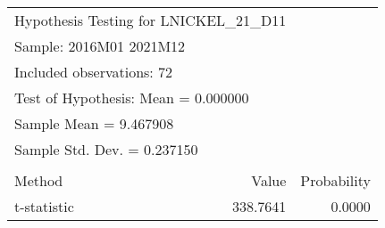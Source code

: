 \begin{tabular}{lrrr}
\toprule
\multicolumn{3}{l}{Hypothesis Testing for LNICKEL\_21\_D11}&\multicolumn{1}{c}{}\\
\multicolumn{2}{l}{Sample: 2016M01 2021M12}&\multicolumn{1}{c}{}&\multicolumn{1}{c}{}\\
\multicolumn{2}{l}{Included observations: 72}&\multicolumn{1}{c}{}&\multicolumn{1}{c}{}\\
\multicolumn{3}{l}{Test of Hypothesis: Mean =  0.000000}&\multicolumn{1}{c}{}\\
\midrule
\multicolumn{2}{l}{Sample Mean =  9.467908}&\multicolumn{1}{c}{}&\multicolumn{1}{c}{}\\
\multicolumn{2}{l}{Sample Std. Dev. =  0.237150}&\multicolumn{1}{c}{}&\multicolumn{1}{c}{}\\
\multicolumn{1}{c}{}&\multicolumn{1}{c}{}&\multicolumn{1}{c}{}&\multicolumn{1}{c}{}\\
\multicolumn{1}{l}{Method}&\multicolumn{1}{c}{}&\multicolumn{1}{r}{Value}&\multicolumn{1}{r}{Probability}\\
\multicolumn{1}{l}{t-statistic}&\multicolumn{1}{c}{}&\multicolumn{1}{r}{338.7641}&\multicolumn{1}{r}{0.0000}\\
\bottomrule
\end{tabular}
